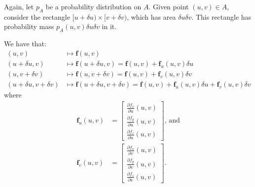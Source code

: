 \documentclass[10pt]{article}
\newcommand{\ve}[1]{\mathbf{#1}}
\begin{document}
  Again, let $p_A$ be a probability distribution on $A$.  Given point $(u,v) \in A$, consider the rectangle $[u + \delta u) \times  [v + \delta v)$, which has area $\delta u \delta v$.  This rectangle has probability mass $p_A(u,v) \delta u \delta v$ in it.

  We have that:
  \begin{align*}
    (u,v) &\mapsto \ve{f}(u,v) \\
    (u+\delta u,v) &\mapsto \ve{f}(u + \delta u,v) = \ve{f}(u,v) + \ve{f}_u (u,v) \delta u\\
    (u,v+\delta v) &\mapsto \ve{f}(u,v + \delta v) = \ve{f}(u,v) + \ve{f}_v (u,v) \delta v\\
    (u+\delta u,v+\delta v) &\mapsto \ve{f}(u + \delta u,v + \delta v) = \ve{f}(u,v) + \ve{f}_u(u,v) \delta u + \ve{f}_v (u,v) \delta v
  \end{align*}
  where
  \begin{align*}
    \ve{f}_u(u,v) &= \begin{bmatrix}
      \frac{\partial f_x}{\partial u}(u,v) \\
      \frac{\partial f_y}{\partial u}(u,v) \\
      \frac{\partial f_z}{\partial u}(u,v)
    \end{bmatrix}\mbox{, and}\\
    \ve{f}_v(u,v) &= \begin{bmatrix}
      \frac{\partial f_x}{\partial v}(u,v) \\
      \frac{\partial f_y}{\partial v}(u,v) \\
      \frac{\partial f_z}{\partial v}(u,v)
    \end{bmatrix}.
  \end{align*}
  
\end{document}
